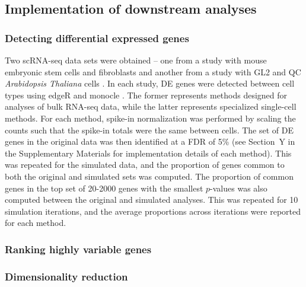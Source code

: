 \documentclass{article}
\begin{document}
\subsection{Implementation of downstream analyses}

\subsubsection{Detecting differential expressed genes}
Two scRNA-seq data sets were obtained -- one from a study with mouse embryonic stem cells and fibroblasts \cite{islam2011characterization} and another from a study with GL2 and QC \textit{Arabidopsis Thaliana} cells \cite{brennecke2013accounting}.
In each study, DE genes were detected between cell types using edgeR \cite{lund2012detecting} and monocle \cite{trapnell2014dynamics}.
The former represents methods designed for analyses of bulk RNA-seq data, while the latter represents specialized single-cell methods.
For each method, spike-in normalization was performed by scaling the counts such that the spike-in totals were the same between cells.
The set of DE genes in the original data was then identified at a FDR of 5\% (see Section~Y in the Supplementary Materials for implementation details of each method).
This was repeated for the simulated data, and the proportion of genes common to both the original and simulated sets was computed.
The proportion of common genes in the top set of 20-2000 genes with the smallest $p$-values was also computed between the original and simulated analyses.
This was repeated for 10 simulation iterations, and the average proportions across iterations were reported for each method.

\subsubsection{Ranking highly variable genes}

\subsubsection{Dimensionality reduction}


{\small


}
\end{document}
